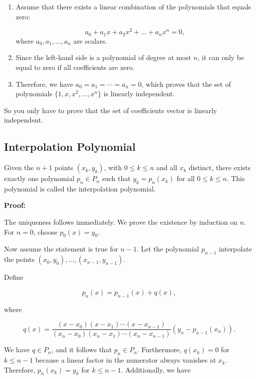 \begin{enumerate}

	\item Assume that there exists a linear combination of the polynomials that equals zero:   

	\[
	    a_0 + a_1 x + a_2 x^2 + \ldots + a_n x^n = 0,
    \]
 		where \(a_0, a_1, \ldots, a_n\) are scalars.
	
	\item Since the left-hand side is a polynomial of degree at most \(n\), it can only be equal 
		  to zero if all coefficients are zero.
 
	\item Therefore, we have \(a_0 = a_1 = \cdots = a_n = 0\), which 
		  proves that the set of polynomials \(\{1, x, x^2, \ldots, x^n\}\) is linearly independent.

\end{enumerate}

So you only have to prove that the set of coefficients vector is linearly independent.

\subsection{Interpolation Polynomial}

Given the \(n+1\) points \((x_k, y_k)\), with \(0 \leq k \leq n\) and all \(x_k\) distinct, 
there exists exactly one polynomial \(p_n \in P_n\) such that \(y_k = p_n(x_k)\) for all 
\(0 \leq k \leq n\). This polynomial is called the interpolation polynomial.

\textbf{Proof:}

The uniqueness follows immediately. We prove the existence by induction on 
\(n\). For \(n = 0\), choose \(p_0(x) = y_0\). 

Now assume the statement is true for \(n-1\). Let the polynomial \(p_{n-1}\)
interpolate the points \((x_0, y_0), \ldots, (x_{n-1}, y_{n-1})\). 

Define

\[
	p_n(x) = p_{n-1}(x) + q(x),
\]

where

\[
	q(x) = \frac{(x - x_0)(x - x_1)\cdots(x - x_{n-1})}{(x_n - x_0)(x_n - x_1)\cdots(x_n - x_{n-1})} 
	(y_n - p_{n-1}(x_n)).
\]

We have \(q \in P_n\), and it follows that \(p_n \in P_n\). 
Furthermore, \(q(x_k) = 0\) for \(k \leq n-1\) because a linear factor in 
the numerator always vanishes at \(x_k\). Therefore, \(p_n(x_k) = y_k\) for 
\(k \leq n-1\). Additionally, we have

